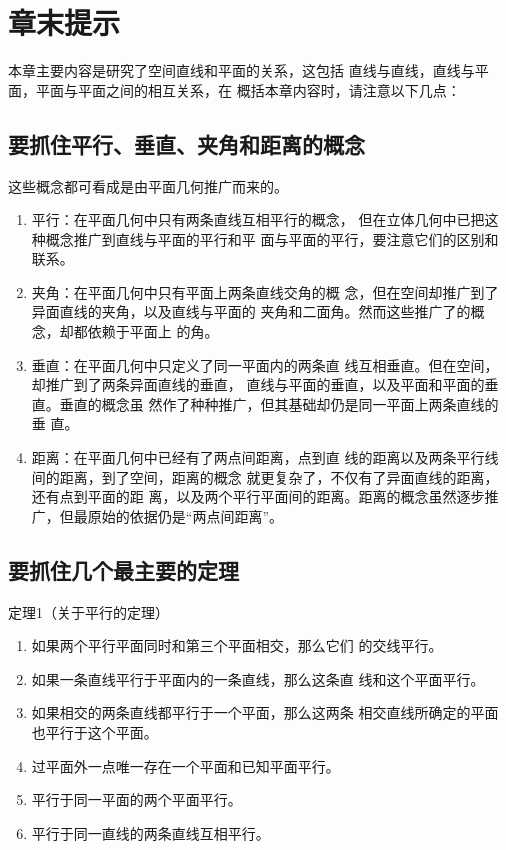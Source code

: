 \section{章末提示}

本章主要内容是研究了空间直线和平面的关系，这包括
直线与直线，直线与平面，平面与平面之间的相互关系，在
概括本章内容时，请注意以下几点：

\subsection{要抓住平行、垂直、夹角和距离的概念}

这些概念都可看成是由平面几何推广而来的。
\begin{enumerate}
\item 平行：在平面几何中只有两条直线互相平行的概念，
但在立体几何中已把这种概念推广到直线与平面的平行和平
面与平面的平行，要注意它们的区别和联系。
\item 夹角：在平面几何中只有平面上两条直线交角的概
念，但在空间却推广到了异面直线的夹角，以及直线与平面的
夹角和二面角。然而这些推广了的概念，却都依赖于平面上
的角。
\item 垂直：在平面几何中只定义了同一平面内的两条直
线互相垂直。但在空间，却推广到了两条异面直线的垂直，
直线与平面的垂直，以及平面和平面的垂直。垂直的概念虽
然作了种种推广，但其基础却仍是同一平面上两条直线的垂
直。
\item 距离：在平面几何中已经有了两点间距离，点到直
线的距离以及两条平行线间的距离，到了空间，距离的概念
就更复杂了，不仅有了异面直线的距离，还有点到平面的距
离，以及两个平行平面间的距离。距离的概念虽然逐步推
广，但最原始的依据仍是“两点间距离”。
\end{enumerate}

\subsection{要抓住几个最主要的定理}
\begin{blk}
    {定理1（关于平行的定理）}
\begin{enumerate}
\item 如果两个平行平面同时和第三个平面相交，那么它们
的交线平行。
\item 如果一条直线平行于平面内的一条直线，那么这条直
线和这个平面平行。
\item 如果相交的两条直线都平行于一个平面，那么这两条
相交直线所确定的平面也平行于这个平面。
\item 过平面外一点唯一存在一个平面和已知平面平行。
\item 平行于同一平面的两个平面平行。
\item 平行于同一直线的两条直线互相平行。
\end{enumerate}
\end{blk}




